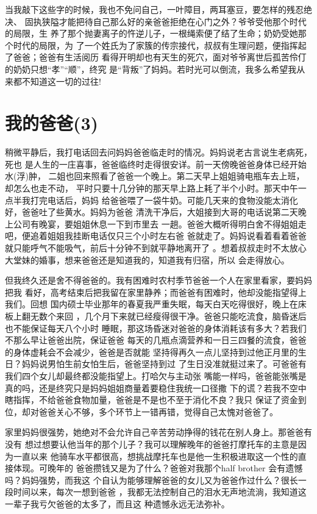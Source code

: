\documentclass[12pt]{book}
\begin{document}
当我敲下这些字的时候，我也不免问自己，一叶障目，两耳塞豆，要怎样的残忍绝决、
固执狭隘才能把待自己那么好的亲爸爸拒绝在心门之外？爷爷受他那个时代的局限，生
养了那个抛妻离子的忤逆儿子，一根绳索便了结了生命；奶奶受她那个时代的局限，为
了一个姓氏为了家簇的传宗接代，叔叔有生理问题，便指挥起了爸爸；爸爸有生活阅历
看得开明却也有天生的死穴，面对爷爷离世后孤苦伶仃的奶奶只想“孝”“顺”，终究
是“背叛”了妈妈。若时光可以倒流，我多么希望我从来都不知道这一切的过往!
\section{我的爸爸(3)}
\label{sec-9-43}

稍微平静后，我打电话回去问妈妈爸爸临走时的情况。妈妈说老古言说生老病死，死也
是人生的一庄喜事，爸爸临终时走得很安详。前一天傍晚爸爸身体已经开始水(浮)肿，
二姐也回来照看了爸爸一个晚上。第二天早上姐姐骑电瓶车去上班，却怎么也走不动，
平时只要十几分钟的那天早上路上耗了半个小时。那天中午一点半我打完电话后，妈妈
给爸爸喂了一袋牛奶。可能几天来的食物没能太消化好，爸爸吐了些黄水。妈妈为爸爸
清洗干净后，大姐接到大哥的电话说第二天晚上公司有晚宴，要姐姐休息一下到市里去
一趟。爸爸大概听得明白舍不得姐姐走吧，便追着姐姐我挂断电话仅只三个小时左右爸
爸就走了。妈妈说看着看着爸爸就只能呼气不能吸气，前后十分钟不到就平静地离开了
。想着叔叔走时不太放心大堂妹的婚事，想来爸爸还是知道我的，知道我有归宿，所以
会走得放心。

但我终久还是舍不得爸爸的。我有困难时农村季节爸爸一个人在家里看家，要妈妈把我
看好，高考结束后把我留在家里静养；而爸爸有困难时，他却没能指望得上我们。回想
国内硕士毕业那年的春夏我严重失眠，每天白天吃得很好，晚上在床板上翻无数个来回
，几个月下来就已经瘦得很干净。爸爸只能吃流食，脑昏迷后也不能保证每天八个小时
睡眠，那这场昏迷对爸爸的身体消耗该有多大？若我们不那么早让爸爸出院，保证爸爸
每天的几瓶点滴营养和一日三四餐的流食，爸爸的身体虚耗会不会减少，爸爸是否就能
坚持得再久一点儿坚持到过他正月里的生日？妈妈说男怕生前女怕生后，爸爸坚持到过
了生日没准就挺过来了。可爸爸有我们四个女儿却最终都没能指望上。打哈欠与主动张
嘴能一样吗，爸爸能张嘴是真的吗，还是终究只是妈妈姐姐商量着要稳住我统一口径撒
下的谎？若我不空中瞎指挥，不给爸爸食物加量，爸爸是不是也不至于消化不良？我只
保证了资金到位，却对爸爸关心不够，多个环节上一错再错，觉得自己太愧对爸爸了。

家里妈妈很强势，她绝对不会允许自己辛苦劳动挣得的钱花在别人身上。那爸爸有没有
想过想要认他当年的那个儿子？我可以理解晚年的爸爸打摩托车的主意是因为一直以来
他骑车水平都很高，想挑战摩托车也是他一生积极进取这一个性的直接体现。可晚年的
爸爸攒钱又是为了什么？爸爸对我那个half brother 会有遗憾吗？妈妈强势，而我这
个自认为能够理解爸爸的女儿又为爸爸作过什么？很长一段时间以来，每次一想到爸爸
，我都无法控制自己的泪水无声地流淌，我知道这一辈子我亏欠爸爸的太多了，而且这
种遗憾永远无法弥补。
\end{document}

